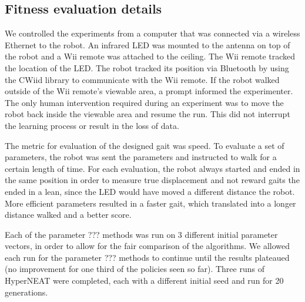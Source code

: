 \subsection{Fitness evaluation details}



We controlled the experiments from a computer that was connected via a wireless Ethernet to the robot. An infrared LED was mounted to the antenna on top of the robot and a Wii remote was attached to the ceiling. The Wii remote tracked the location of the LED. The robot tracked its position via Bluetooth by using the CWiid library\cite{cwiid} to communicate with the Wii remote. If the robot walked outside of the Wii remote's viewable area, a prompt informed the experimenter. The only human intervention required during an experiment was to move the robot back inside the viewable area and resume the run. This did not interrupt the learning process or result in the loss of data.

The metric for evaluation of the designed gait was speed. To evaluate a set of parameters, the robot was sent the parameters and instructed to walk for a certain length of time. For each evaluation, the robot always started and ended in the same position in order to measure true displacement and not reward gaits the ended in a lean, since the LED would have moved a different distance the robot. More efficient parameters resulted in a faster gait, which translated into a longer distance walked and a better score.

Each of the parameter ??? methods was run on 3 different initial parameter vectors, in order to allow for the fair comparison of the algorithms. We allowed each run for the parameter ??? methods to continue until the results plateaued (no improvement for one third of the policies seen so far). Three runs of HyperNEAT were completed, each with a different initial seed and run for 20 generations.
